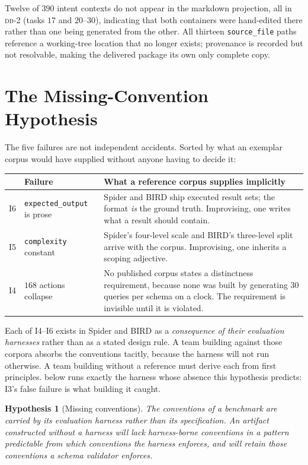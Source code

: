 \documentclass[11pt,letterpaper]{article}
\theoremstyle{definition}
\theoremstyle{plain}
\newtheorem{hypothesis}{Hypothesis}
\theoremstyle{remark}
\newcommand{\dbn}[1]{\textsc{db-#1}}
\newcommand{\code}[1]{\texttt{#1}}
\begin{document}
Twelve of $390$ intent contexts do not appear in the markdown projection, all in \dbn{2}
(tasks $17$ and $20$--$30$), indicating that both containers were hand-edited there rather
than one being generated from the other. All thirteen
\code{source\_file} paths reference a working-tree location that no longer exists; provenance
is recorded but not resolvable, making the delivered package its own only complete copy.

\section{The Missing-Convention Hypothesis}
\label{sec:hypothesis}

The five failures are not independent accidents. Sorted by what an exemplar corpus would have
supplied without anyone having to decide it:

\begin{center}\small
\begin{tabular}{@{}llp{7.1cm}@{}}
\toprule
& \textbf{Failure} & \textbf{What a reference corpus supplies implicitly} \\
\midrule
I6 & \code{expected\_output} is prose & Spider and BIRD ship executed result sets; the format
  \emph{is} the ground truth. Improvising, one writes what a result should contain. \\
I5 & \code{complexity} constant & Spider's four-level scale and BIRD's three-level split
  arrive with the corpus. Improvising, one inherits a scoping adjective. \\
I4 & $168$ actions collapse & No published corpus states a distinctness requirement, because
  none was built by generating $30$ queries per schema on a clock. The requirement is
  invisible until it is violated. \\
\bottomrule
\end{tabular}
\end{center}

Each of I4--I6 exists in Spider and BIRD as a \emph{consequence of their evaluation harnesses}
rather than as a stated design rule. A team building against those corpora absorbs the
conventions tacitly, because the harness will not run otherwise. A team building without a
reference must derive each from first principles.  below runs exactly the
harness whose absence this hypothesis predicts: I3's false failure is what building it caught.

\begin{hypothesis}[Missing conventions]
\label{hyp:main}
The conventions of a benchmark are carried by its evaluation harness rather than its
specification. An artifact constructed without a harness will lack harness-borne conventions
in a pattern predictable from which conventions the harness enforces, and will retain those
conventions a schema validator enforces.
\end{hypothesis}
\end{document}
